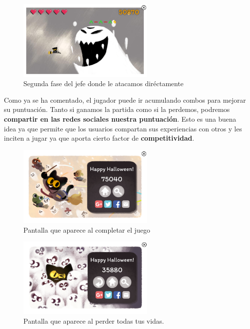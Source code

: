 \clearpage

\begin{figure}[htbp]
\centering
  \includegraphics[width=0.6\textwidth]{archivos/jefe-ataque.png}
  \caption{Segunda fase del jefe donde le atacamos diréctamente}
  \label{fig:jefe2}
\end{figure}

\vspace{0.5cm}

Como ya se ha comentado, el jugador puede ir acumulando combos para mejorar su puntuación. Tanto si ganamos la partida como si la perdemos, podremos \textbf{compartir en las redes sociales nuestra puntuación}. Esto es una buena idea ya que permite que los usuarios compartan sus experiencias con otros y les inciten a jugar ya que aporta cierto factor de \textbf{competitividad}.

\begin{figure}[htbp]
\centering
  \includegraphics[width=0.6\textwidth]{archivos/pantalla-win.png}
  \caption{Pantalla que aparece al completar el juego}
  \label{fig:halloweenwin}
\end{figure}

\clearpage

\begin{figure}[htbp]
\centering
  \includegraphics[width=0.6\textwidth]{archivos/pantalla-game-over.png}
  \caption{Pantalla que aparece al perder todas tus vidas.}
  \label{fig:halloweengo}
\end{figure}

